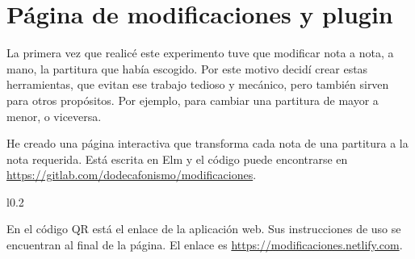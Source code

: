     \newpage
    
    \section{Página de modificaciones y plugin}
	
	La primera vez que realicé este experimento tuve que modificar nota a nota, a mano, la partitura que había escogido. Por este motivo decidí crear estas herramientas, que evitan ese trabajo tedioso y mecánico, pero también sirven para otros propósitos. Por ejemplo, para cambiar una partitura de mayor a menor, o viceversa.
	
    He creado una página interactiva que transforma cada nota de una partitura a la nota requerida. Está escrita en Elm y el código puede encontrarse en \url{https://gitlab.com/dodecafonismo/modificaciones}.
   
    \begin{wrapfigure}{l}{0.2\textwidth}
    	\vspace*{-\bigskipamount}
    	\vspace*{-2\bigskipamount}
    \end{wrapfigure} En el código QR está el enlace de la aplicación web. Sus instrucciones de uso se encuentran al final de la página. El enlace es \url{https://modificaciones.netlify.com}.
    
